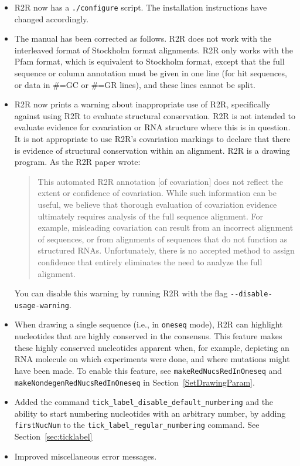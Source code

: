 \documentclass[letterpaper,12pt]{report}
\begin{document}
\begin{itemize}
\begin{itemize}
    \item R2R now has a {\tt ./configure} script.  The installation instructions have changed accordingly.
    \item The manual has been corrected as follows.  R2R does not work with the interleaved format of Stockholm format alignments.  R2R only works with the Pfam format, which is equivalent to Stockholm format, except that the full sequence or column annotation must be given in one line (for hit sequences, or data in \#=GC or \#=GR lines), and these lines cannot be split.
    \item R2R now prints a warning about inappropriate use of R2R, specifically against using R2R to evaluate structural conservation.  R2R is not intended to evaluate evidence for covariation or RNA structure where this is in question. It is not appropriate to use R2R's covariation markings to declare that there is evidence of structural conservation within an alignment.  R2R is a drawing program.  As the R2R paper wrote\cite{RtoR}:
\begin{quote}This automated R2R annotation [of covariation] does not reflect the extent or confidence of covariation. While such information can be useful, we believe that thorough evaluation of covariation evidence ultimately requires analysis of the full sequence alignment. For example, misleading covariation can result from an incorrect alignment of sequences, or from alignments of sequences that do not function as structured RNAs. Unfortunately, there is no accepted method to assign confidence that entirely eliminates the need to analyze the full alignment.
\end{quote}
You can disable this warning by running R2R with the flag {\tt -{}-disable-usage-warning}.
    \item When drawing a single sequence (i.e., in {\tt oneseq} mode), R2R can highlight nucleotides that are highly conserved in the consensus.  This feature makes these highly conserved nucleotides apparent when, for example, depicting an RNA molecule on which experiments were done, and where mutations might have been made. To enable this feature, see {\tt makeRedNucsRedInOneseq} and {\tt makeNondegenRedNucsRedInOneseq} in Section~\ref{SetDrawingParam}.
    \item Added the command {\tt tick\_label\_disable\_default\_numbering} and the ability to start numbering nucleotides with an arbitrary number, by adding {\tt firstNucNum} to the {\tt tick\_label\_regular\_numbering} command. See Section~\ref{sec:ticklabel}
    \item Improved miscellaneous error messages.

\end{itemize}
\end{itemize}
\end{document}
